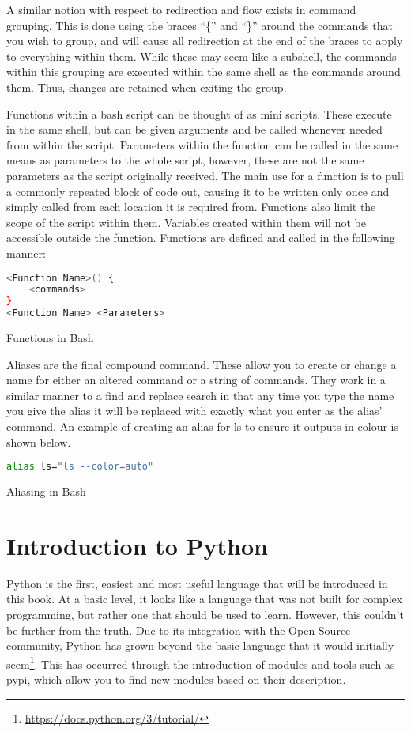 			A similar notion with respect to redirection and flow exists in command grouping.
			This is done using the braces ``\{'' and ``\}'' around the commands that you wish to group, and will cause all redirection at the end of the braces to apply to everything within them.
			While these may seem like a subshell, the commands within this grouping are executed within the same shell as the commands around them.
			Thus, changes are retained when exiting the group.

			Functions within a bash script can be thought of as mini scripts.
			These execute in the same shell, but can be given arguments and be called whenever needed from within the script.
			Parameters within the function can be called in the same means as parameters to the whole script, however, these are not the same parameters as the script originally received.
			The main use for a function is to pull a commonly repeated block of code out, causing it to be written only once and simply called from each location it is required from.
			Functions also limit the scope of the script within them.
			Variables created within them will not be accessible outside the function.
			Functions are defined and called in the following manner:
			\begin{code}
			\begin{lstlisting}[language=bash]
<Function Name>() {
	<commands>
}
<Function Name> <Parameters>
			\end{lstlisting}
			\label{code:bashFunctions}
			\caption{Functions in Bash}
			\end{code}


			Aliases are the final compound command.
			These allow you to create or change a name for either an altered command or a string of commands.
			They work in a similar manner to a find and replace search in that any time you type the name you give the alias it will be replaced with exactly what you enter as the alias' command.
			An example of creating an alias for ls to ensure it outputs in colour is shown below.
			\begin{code}
			\begin{lstlisting}[language=bash]
alias ls="ls --color=auto"
			\end{lstlisting}
			\label{code:bashAlias}
			\caption{Aliasing in Bash}
			\end{code}
	\section{Introduction to Python}
		Python is the first, easiest and most useful language that will be introduced in this book.\cite{PythonBoringStuff}
		At a basic level, it looks like a language that was not built for complex programming, but rather one that should be used to learn.
		However, this couldn't be further from the truth.
		Due to its integration with the Open Source community, Python has grown beyond the basic language that it would initially seem\footnote{\url{https://docs.python.org/3/tutorial/}}.
		This has occurred through the introduction of modules and tools such as pypi, which allow you to find new modules based on their description.
